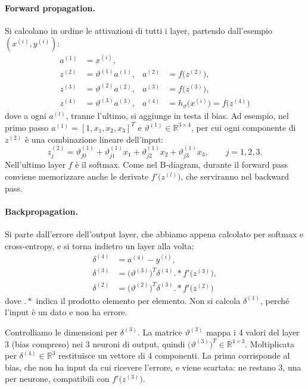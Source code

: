 \paragraph{Forward propagation.}
Si calcolano in ordine le attivazioni di tutti i layer, partendo dall'esempio $(x^{(i)}, y^{(i)})$:
\[
\begin{aligned}
a^{(1)} &= x^{(i)}, \\
z^{(2)} &= \vartheta^{(1)}a^{(1)}, & a^{(2)} &= f\big(z^{(2)}\big), \\
z^{(3)} &= \vartheta^{(2)}a^{(2)}, & a^{(3)} &= f\big(z^{(3)}\big), \\
z^{(4)} &= \vartheta^{(3)}a^{(3)}, & a^{(4)} &= h_\vartheta\big(x^{(i)}\big) = f\big(z^{(4)}\big)
\end{aligned}
\]
dove a ogni $a^{(l)}$, tranne l'ultimo, si aggiunge in testa il bias. Ad esempio, nel primo passo $a^{(1)} = [1, x_1, x_2, x_3]^T$ e $\vartheta^{(1)} \in \mathbb{R}^{3 \times 4}$, per cui ogni componente di $z^{(2)}$ è una combinazione lineare dell'input:
\[
z_j^{(2)} = \vartheta_{j0}^{(1)} + \vartheta_{j1}^{(1)}x_1 + \vartheta_{j2}^{(1)}x_2 + \vartheta_{j3}^{(1)}x_3, \qquad j = 1, 2, 3.
\]
Nell'ultimo layer $f$ è il softmax. Come nel B-diagram, durante il forward pass conviene memorizzare anche le derivate $f'\big(z^{(l)}\big)$, che serviranno nel backward pass.

\paragraph{Backpropagation.}
Si parte dall'errore dell'output layer, che abbiamo appena calcolato per softmax e cross-entropy, e si torna indietro un layer alla volta:
\[
\begin{aligned}
\delta^{(4)} &= a^{(4)} - y^{(i)}, \\
\delta^{(3)} &= \big(\vartheta^{(3)}\big)^T\delta^{(4)} \mathbin{.*} f'\big(z^{(3)}\big), \\
\delta^{(2)} &= \big(\vartheta^{(2)}\big)^T\delta^{(3)} \mathbin{.*} f'\big(z^{(2)}\big)
\end{aligned}
\]
dove $.*$ indica il prodotto elemento per elemento. Non si calcola $\delta^{(1)}$, perché l'input è un dato e non ha errore.

Controlliamo le dimensioni per $\delta^{(3)}$. La matrice $\vartheta^{(3)}$ mappa i 4 valori del layer 3 (bias compreso) nei 3 neuroni di output, quindi $\big(\vartheta^{(3)}\big)^T \in \mathbb{R}^{4 \times 3}$. Moltiplicata per $\delta^{(4)} \in \mathbb{R}^3$ restituisce un vettore di 4 componenti. La prima corrisponde al bias, che non ha input da cui ricevere l'errore, e viene scartata: ne restano 3, una per neurone, compatibili con $f'\big(z^{(3)}\big)$.

